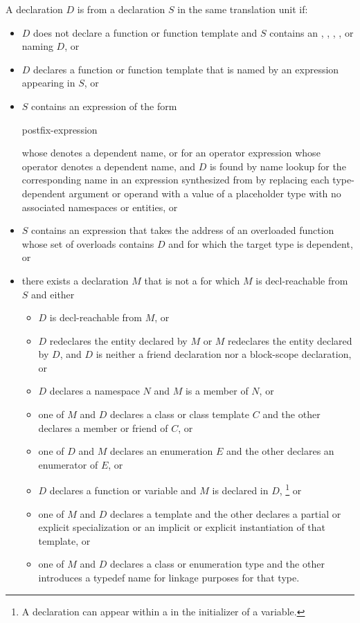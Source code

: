 \pnum
A declaration $D$ is  from a declaration $S$
in the same translation unit if:
\begin{itemize}
\item
$D$ does not declare a function or function template and
$S$ contains an
,
,
,
, or
naming $D$, or

\item
$D$ declares a function or function template that
is named by an expression
appearing in $S$, or

\item
$S$ contains an expression  of the form

\begin{ncsimplebnf}
postfix-expression \terminal{(}  \terminal{)}
\end{ncsimplebnf}
whose  denotes a dependent name,
or for an operator expression whose operator denotes a dependent name,
and $D$ is found by name lookup for the corresponding name
in an expression synthesized from 
by replacing each type-dependent argument or operand
with a value of a placeholder type
with no associated namespaces or entities, or

\item
$S$ contains an expression that
takes the address of an overloaded function
whose set of overloads contains $D$ and
for which the target type is dependent, or

\item
there exists a declaration $M$ that is not a 
for which $M$ is decl-reachable from $S$ and either
\begin{itemize}
\item
$D$ is decl-reachable from $M$, or
\item
$D$ redeclares the entity declared by $M$ or
$M$ redeclares the entity declared by $D$,
and $D$ is neither a friend declaration
nor a block-scope declaration, or
\item
$D$ declares a namespace $N$ and $M$ is a member of $N$, or
\item
one of $M$ and $D$ declares a class or class template $C$
and the other declares a member or friend of $C$, or
\item
one of $D$ and $M$ declares an enumeration $E$
and the other declares an enumerator of $E$, or
\item
$D$ declares a function or variable and $M$ is declared in $D$,%
\footnote{A declaration can appear within a 
in the initializer of a variable.} or
\item
one of $M$ and $D$ declares a template and the other declares
a partial or explicit specialization or
an implicit or explicit instantiation of that template, or
\item 
one of $M$ and $D$ declares a class or enumeration type
and the other introduces a typedef name for linkage purposes for that type.
\end{itemize}
\end{itemize}

